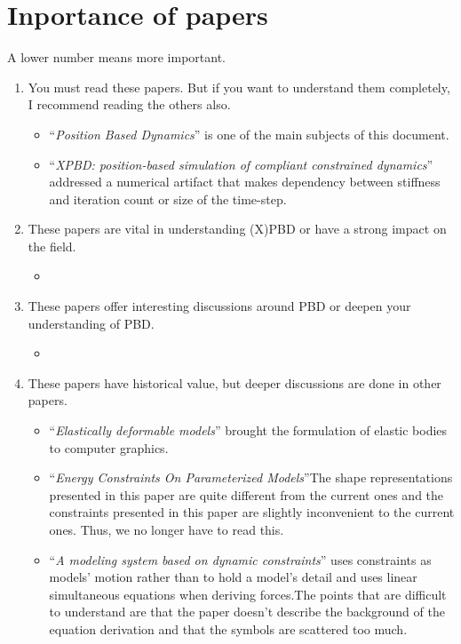 \documentclass[pdflatex,sn-mathphys-num]{sn-jnl}%
\theoremstyle{thmstyleone}%
\theoremstyle{thmstyletwo}%
\theoremstyle{thmstylethree}%
\newcommand{\pname}[1]{``{\sl #1}''}
\begin{document}
\section{Inportance of papers}
A lower number means more important.
\begin{enumerate}
	\item You must read these papers. But if you want to understand them completely, I recommend reading the others also.
		\begin{itemize}
			\item \pname{Position Based Dynamics}\cite{PBD} is one of the main subjects of this document.
			\item \pname{XPBD: position-based simulation of compliant constrained dynamics}\cite{XPBD}  addressed a numerical artifact that makes dependency between stiffness and \gls{iteration} count or size of the time-step.
		\end{itemize}
	\item  These papers are vital in understanding (X)PBD or have a strong impact on the field.
		\begin{itemize}
			\item 
		\end{itemize}
	\item These papers offer interesting discussions around PBD or deepen your understanding of PBD.
		\begin{itemize}
			\item 
		\end{itemize}
	\item These papers have historical value, but deeper discussions are done in other papers.
		\begin{itemize}
		\item \pname{Elastically deformable models}\cite{ElasticTerzopoulos}  brought the formulation of elastic bodies to computer graphics.
		\item \pname{Energy Constraints On Parameterized Models}\cite{Witkin1987}The shape representations presented in this paper are quite different from the current ones and the constraints presented in this paper are slightly inconvenient to the current ones. Thus, we no longer have to read this.
		\item \pname{A modeling system based on dynamic constraints}\cite{Barzel1988} uses constraints as models' motion rather than to hold a model's detail and uses linear simultaneous equations when deriving forces.The points that are difficult to understand are that the paper doesn't describe the background of the equation derivation and that the symbols are scattered too much.

\end{itemize}
\end{enumerate}
\end{document}
